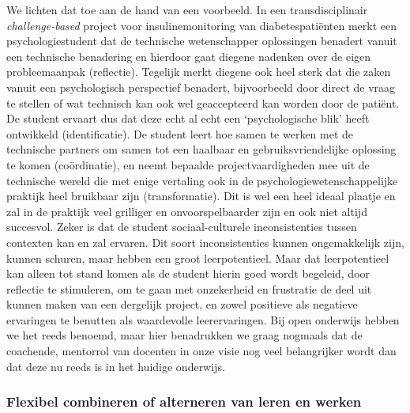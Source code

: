 \documentclass[smallauthor, chapterhaspagenum, nochapterinheader, pagenuminheader,  bigchapnum,medium2, tocpages,  garamond, titleinheader]{jote-book}
\begin{document}
	We lichten dat toe aan de hand van een voorbeeld. In een transdisciplinair \emph{challenge-based} project voor insulinemonitoring van diabetespatiënten merkt een psychologiestudent dat de technische wetenschapper oplossingen benadert vanuit een technische benadering en hierdoor gaat diegene nadenken over de eigen probleemaanpak (reflectie). Tegelijk merkt diegene ook heel sterk dat die zaken vanuit een psychologisch perspectief benadert, bijvoorbeeld door direct de vraag te stellen of wat technisch kan ook wel geaccepteerd kan worden door de patiënt. De student ervaart dus dat deze echt al echt een ‘psychologische blik' heeft ontwikkeld (identificatie). De student leert hoe samen te werken met de technische partners om samen tot een haalbaar en gebruiksvriendelijke oplossing te komen (coördinatie), en neemt bepaalde projectvaardigheden mee uit de technische wereld die met enige vertaling ook in de psychologiewetenschappelijke praktijk heel bruikbaar zijn (transformatie). Dit is wel een heel ideaal plaatje en zal in de praktijk veel grilliger en onvoorspelbaarder zijn en ook niet altijd succesvol. Zeker is dat de student sociaal-culturele inconsistenties tussen contexten kan en zal ervaren. Dit soort inconsistenties kunnen ongemakkelijk zijn, kunnen schuren, maar hebben een groot leerpotentieel. Maar dat leerpotentieel kan alleen tot stand komen als de student hierin goed wordt begeleid, door reflectie te stimuleren, om te gaan met onzekerheid en frustratie de deel uit kunnen maken van een dergelijk project, en zowel positieve als negatieve ervaringen te benutten als waardevolle leerervaringen. Bij open onderwijs hebben we het reeds benoemd, maar hier benadrukken we graag nogmaals dat de coachende, mentorrol van docenten in onze visie nog veel belangrijker wordt dan dat deze nu reeds is in het huidige onderwijs.



	\subsubsection{Flexibel combineren of alterneren van leren en werken}
\end{document}
